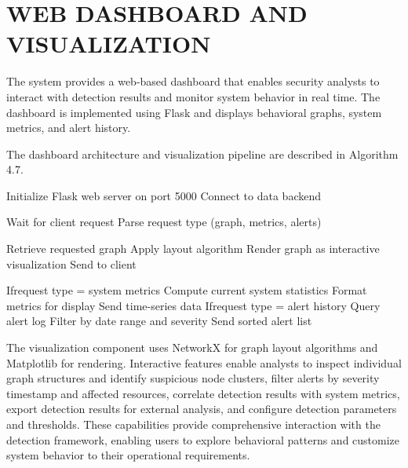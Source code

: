 \section{\uppercase{WEB DASHBOARD AND VISUALIZATION}}

The system provides a web-based dashboard that enables security analysts to interact with detection results and monitor system behavior in real time. The dashboard is implemented using Flask and displays behavioral graphs, system metrics, and alert history.

The dashboard architecture and visualization pipeline are described in Algorithm 4.7.

\begin{algorithm}
\caption{Web Dashboard Visualization and Interaction}
\begin{algorithmic}[1]

\State Initialize Flask web server on port 5000
\State Connect to data backend


\State Wait for client request
\State Parse request type (graph, metrics, alerts)

\State Retrieve requested graph
\State Apply layout algorithm
\State Render graph as interactive visualization
\State Send to client

\Else If{request type = system metrics}
\State Compute current system statistics
\State Format metrics for display
\State Send time-series data
\Else If{request type = alert history}
\State Query alert log
\State Filter by date range and severity
\State Send sorted alert list
\EndIf

\EndWhile

\end{algorithmic}
\end{algorithm}

The visualization component uses NetworkX for graph layout algorithms and Matplotlib for rendering. Interactive features enable analysts to inspect individual graph structures and identify suspicious node clusters, filter alerts by severity timestamp and affected resources, correlate detection results with system metrics, export detection results for external analysis, and configure detection parameters and thresholds. These capabilities provide comprehensive interaction with the detection framework, enabling users to explore behavioral patterns and customize system behavior to their operational requirements.

